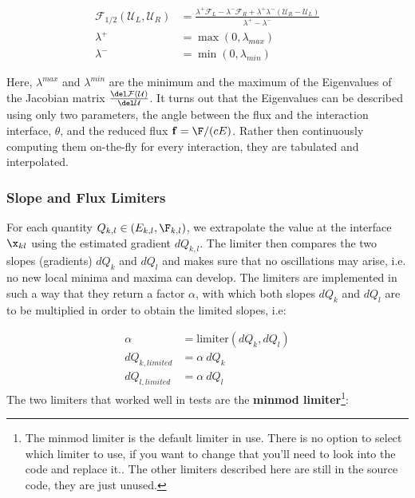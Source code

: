 \begin{align}
	\mathcal{F}_{1/2}(\mathcal{U}_L, \mathcal{U}_R) &=
		\frac{ \lambda^{+} \mathcal{F}_{L} - \lambda^{-} \mathcal{F}_{R} +  \lambda^{+}  
\lambda^{-} (\mathcal{U}_R - \mathcal{U}_L)}{ \lambda^{+} - \lambda^{-} } 
\label{eq:riemann-HLL} \\
    \lambda^+ &= \max(0, \lambda_{max})\\
    \lambda^- &= \min(0, \lambda_{min})
\end{align}


Here, $\lambda^{max}$ and $\lambda^{min}$ are the minimum and the maximum of the Eigenvalues of the 
Jacobian matrix $\frac{\del \mathcal{F}(\mathcal{U})}{\del \mathcal{U}}$. It turns out that the 
Eigenvalues can be described using only two parameters, the angle between the flux and the 
interaction interface, $\theta$, and the reduced flux $\mathbf{f} = \F / (cE)$. Rather then 
continuously computing them on-the-fly for every interaction, they are tabulated and interpolated.





\subsubsection{Slope and Flux Limiters} \label{chap:limiters}

For each quantity $Q_{k,l} \in (E_{k,l}, \F_{k,l})$, we extrapolate the value at the interface
$\x_{kl}$ using the estimated gradient $dQ_{k,l}$. The limiter then compares the two slopes
(gradients) $dQ_k$ and $dQ_l$ and makes sure that no oscillations may arise, i.e. no new local
minima and maxima can develop. The limiters are implemented in such a way that they return a factor
$\alpha$, with which both slopes $dQ_k$ and $dQ_l$ are to be multiplied in order to obtain the
limited slopes, i.e:

\begin{align}
	\alpha &= \text{limiter}(dQ_k, dQ_l)\\
	dQ_{k, limited} &= \alpha\ dQ_k\\
	dQ_{l, limited} &= \alpha\ dQ_l
\end{align}
The two limiters that worked well in tests are the \textbf{minmod limiter}\footnote{The minmod 
limiter is the default limiter in use. There is no option to select which limiter to use, if you 
want to change that you'll need to look into the code and replace it.. The other limiters described 
here are still in the source code, they are just unused.}:

